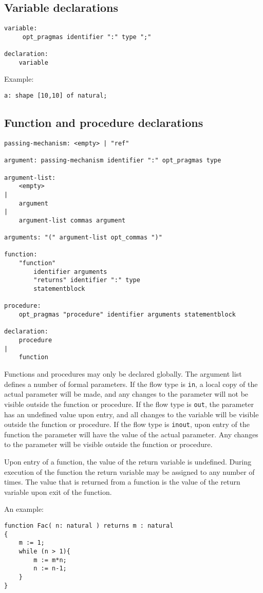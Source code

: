 \documentclass[a4paper]{article}
\begin{document}
\subsection{Variable declarations}
\begin{verbatim}
variable:
     opt_pragmas identifier ":" type ";"

declaration:
    variable
\end{verbatim}
\par
Example:
\begin{verbatim}
a: shape [10,10] of natural;
\end{verbatim}
\subsection{Function and procedure declarations}
\label{s.fndecl}
\begin{verbatim}
passing-mechanism: <empty> | "ref"

argument: passing-mechanism identifier ":" opt_pragmas type

argument-list:
    <empty>
|
    argument
|
    argument-list commas argument

arguments: "(" argument-list opt_commas ")"

function:
    "function"
        identifier arguments
        "returns" identifier ":" type
        statementblock

procedure:
    opt_pragmas "procedure" identifier arguments statementblock

declaration:
    procedure
|
    function
\end{verbatim}
Functions and procedures may only be declared globally. 
The argument list defines a number of formal parameters.
If the flow type is \verb"in", a local copy of the actual parameter
will be made, and any changes to the parameter will not be visible outside
the function or procedure.
If the flow type is \verb"out", the parameter has an undefined value
upon entry, and all changes to the variable will be visible outside
the function or procedure.
If the flow type is \verb"inout", upon entry of the function the parameter
will have the value of the actual parameter. Any changes to the parameter
will be visible outside the function or procedure.
\par
Upon entry of a function, the value of the return variable is undefined.
During execution of the function the return variable may be assigned to
any number of times.
The value that is returned from a function is the value of the return
variable upon exit of the function.
\par
An example:
\begin{verbatim}
function Fac( n: natural ) returns m : natural
{
    m := 1;
    while (n > 1){
        m := m*n;
        n := n-1;
    }
}
\end{verbatim}
\end{document}
